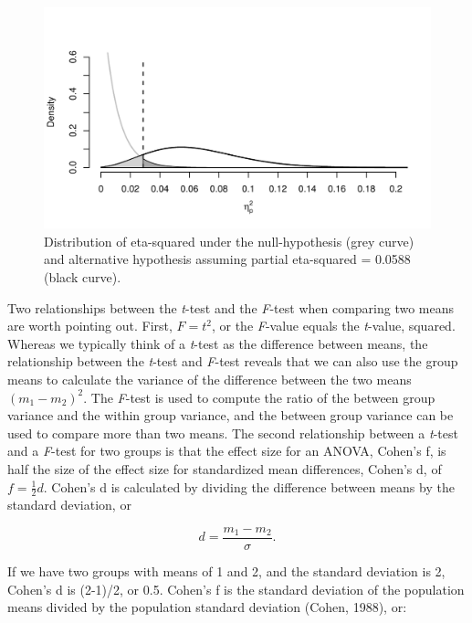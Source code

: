 \documentclass[,man,floatsintext]{apa6}
\begin{document}
\begin{figure}
\centering
\includegraphics{0.1_Simulation_Based_Power_Analysis_For_Factorial_ANOVA_Designs_files/figure-latex/eta-plot-1.pdf}
\caption{\label{fig:eta-plot}Distribution of eta-squared under the
null-hypothesis (grey curve) and alternative hypothesis assuming partial
eta-squared = 0.0588 (black curve).}
\end{figure}

Two relationships between the \emph{t}-test and the \emph{F}-test when
comparing two means are worth pointing out. First, \(F = t^2\), or the
\emph{F}-value equals the \emph{t}-value, squared. Whereas we typically
think of a \emph{t}-test as the difference between means, the
relationship between the \emph{t}-test and \emph{F}-test reveals that we
can also use the group means to calculate the variance of the difference
between the two means \((m_1 - m_2)^2\). The \emph{F}-test is used to
compute the ratio of the between group variance and the within group
variance, and the between group variance can be used to compare more
than two means. The second relationship between a \emph{t}-test and a
\emph{F}-test for two groups is that the effect size for an ANOVA,
Cohen's f, is half the size of the effect size for standardized mean
differences, Cohen's d, of \(f = \frac{1}{2}d\). Cohen's d is calculated
by dividing the difference between means by the standard deviation, or

\begin{equation}
d = \frac{m_1-m_2}{\sigma}.
\end{equation}

If we have two groups with means of 1 and 2, and the standard deviation
is 2, Cohen's d is (2-1)/2, or 0.5. Cohen's f is the standard deviation
of the population means divided by the population standard deviation
(Cohen, 1988), or:
\end{document}
